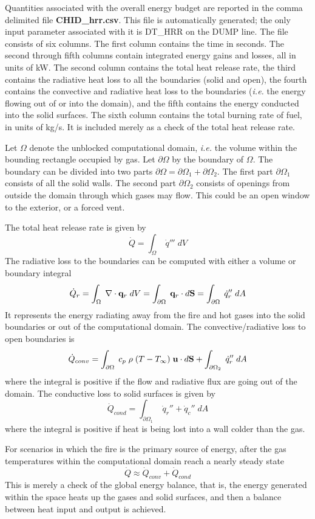 \documentclass[11pt]{book}
\newcommand{\dS}{{d\bf S}}
\newcommand{\dA}{{dA}}
\newcommand{\bq}{{\bf q}}
\newcommand{\bu}{{\bf u}}
\newcommand{\dq}{\dot{q}}
\newcommand{\be}{\begin{equation}}
\newcommand{\ee}{\end{equation}}
\begin{document}
Quantities associated with the overall energy budget are
reported in the comma delimited
file {\bf CHID\_hrr.csv}. This file is automatically generated; the only input parameter associated with it is
{\ct DT\_HRR} on the {\ct DUMP} line. The file consists of six columns.
The first column contains the time in seconds. The second through
fifth columns contain integrated energy gains and losses, all in
units of kW. The second column contains
the total heat release rate, the third contains the
radiative heat loss to all the boundaries (solid and open), the fourth contains the
convective and radiative heat loss to the boundaries ({\em i.e.} the energy
flowing out of or into the domain), and the fifth contains the energy conducted
into the solid surfaces.
The sixth column contains the total burning rate of fuel, in units of kg/s. It is included merely as a check
of the total heat release rate.

Let $\Omega$ denote the unblocked computational domain, {\em i.e.} the volume within the bounding rectangle
occupied by gas. Let $\partial \Omega$ by the boundary of $\Omega$. The boundary can be divided into two parts
$\partial \Omega = \partial \Omega_1 + \partial \Omega_2$. The first part $\partial \Omega_1$ consists of all the solid
walls. The second part $\partial \Omega_2$ consists of openings from outside the domain through which gases may flow. This
could be an open window to the exterior, or a forced vent.

The total heat release rate is given by
\be \dot{Q} = \int_\Omega \; \dq''' \; dV \ee
The radiative loss to the
boundaries can be computed with either a volume or boundary integral
\be \dot{Q}_r = \int_\Omega \; \nabla \cdot \bq_r \; dV =
\int_{\partial \Omega} \; \bq_r \cdot \dS = \int_{\partial \Omega} \; \dq_r'' \; \dA \ee
It represents the energy radiating away from the fire and hot gases into
the solid boundaries or out of the computational domain. The convective/radiative
loss to open boundaries is
\be \dot{Q}_{conv} =  \int_{\partial \Omega} \; c_p \; \rho \; (T-T_\infty) \; \bu \cdot \dS
   + \int_{\partial \Omega_2} \; \dq_r'' \; \dA  \ee
where the integral is positive if the flow and radiative flux are going out of the domain.
The conductive loss to solid surfaces is given by
\be \dot{Q}_{cond} = \int_{\partial \Omega_1} \; \dq_r'' + \dq_c'' \; \dA  \ee
where the integral is positive if heat is being lost into a wall colder
than the gas.

For scenarios in which the fire is the primary source of energy, after the gas temperatures
within the computational domain reach a nearly steady state
\be \dot{Q} \approx \dot{Q}_{conv} + \dot{Q}_{cond}  \ee
This is merely a check of the global energy balance, that is, the energy generated within the space
heats up the gases and solid surfaces, and then a balance between heat input and output is achieved.
\end{document}
